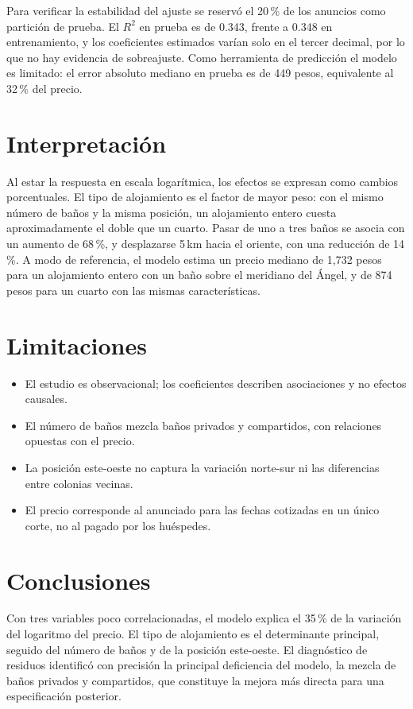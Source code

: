\documentclass{llncs}
\begin{document}
Para verificar la estabilidad del ajuste se reservó el 20\,\% de los
anuncios como partición de prueba. El $R^2$ en prueba es de 0.343,
frente a 0.348 en entrenamiento, y los coeficientes estimados varían
solo en el tercer decimal, por lo que no hay evidencia de
sobreajuste. Como herramienta de predicción el modelo es limitado: el
error absoluto mediano en prueba es de 449 pesos, equivalente al
32\,\% del precio.


\section*{Interpretación}

Al estar la respuesta en escala logarítmica, los efectos se expresan
como cambios porcentuales. El tipo de alojamiento es el factor de
mayor peso: con el mismo número de baños y la misma posición, un
alojamiento entero cuesta aproximadamente el doble que un cuarto. Pasar
de uno a tres baños se asocia con un aumento de 68\,\%, y desplazarse
5\,km hacia el oriente, con una reducción de 14\,\%. A modo de
referencia, el modelo estima un precio mediano de 1,732 pesos para un
alojamiento entero con un baño sobre el meridiano del Ángel, y de 874
pesos para un cuarto con las mismas características.


\section*{Limitaciones}

\begin{itemize}
\item El estudio es observacional; los coeficientes describen
asociaciones y no efectos causales.
\item El número de baños mezcla baños privados y compartidos, con
relaciones opuestas con el precio.
\item La posición este-oeste no captura la variación norte-sur ni las
diferencias entre colonias vecinas.
\item El precio corresponde al anunciado para las fechas cotizadas en
un único corte, no al pagado por los huéspedes.
\end{itemize}


\section*{Conclusiones}

Con tres variables poco correlacionadas, el modelo explica el 35\,\%
de la variación del logaritmo del precio. El tipo de alojamiento es el
determinante principal, seguido del número de baños y de la posición
este-oeste. El diagnóstico de residuos identificó con precisión la
principal deficiencia del modelo, la mezcla de baños privados y
compartidos, que constituye la mejora más directa para una
especificación posterior.
\end{document}
